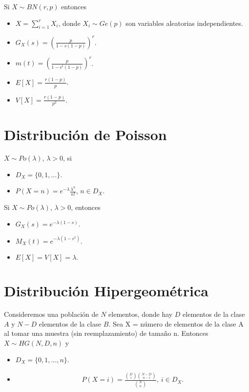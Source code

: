 \begin{obs}
    Si $X \sim BN(r,p)$ entonces
    \begin{itemize}
        \item $X = \sum_{i=1}^{r}{X_i}$, donde $X_i \sim Ge(p)$ son variables aleatorias independientes.
        \item $G_X(s) = \left(\frac{p}{1 - s(1 - p)}\right)^r$.
        \item $m(t) = \left(\frac{p}{1 - e^t(1 - p)}\right)^r$.
        \item $E[X] = \frac{r(1 - p)}{p}$.
        \item $V[X] = \frac{r(1 - p)}{p^2}$.
    \end{itemize}
\end{obs}

\section{Distribución de Poisson}

\begin{defi}
    $X \sim Po(\lambda)$, $\lambda > 0$, si
    \begin{itemize}
        \item $D_X = \{0,1,...\}$.
        \item $P(X = n) = e^{-\lambda}\frac{\lambda^n}{n!}$, $n \in D_X$.
    \end{itemize}
\end{defi}

\begin{obs}
    Si $X \sim Po(\lambda)$, $\lambda > 0$, entonces
    \begin{itemize}
        \item $G_X(s) = e^{-\lambda(1 - s)}$.
        \item $M_X(t) = e^{-\lambda(1 - e^t)}$.
        \item $E[X] = V[X] = \lambda$.
    \end{itemize}
\end{obs}

\section{Distribución Hipergeométrica}

\begin{defi}
    Consideremos una población de $N$ elementos, donde hay $D$ elementos de la clase $A$ y $N - D$ elementos de la clase $B$. Sea X = número de elementos de la clase A al tomar una muestra (sin reemplazamiento) de tamaño n. Entonces $X \sim HG(N,D,n)$ y
    \begin{itemize}
        \item $D_X = \{0,1,...,n\}$.
        \item
              \begin{align*}
                  P(X = i) = \frac{\binom{D}{i}\binom{N - D}{n - i}}{\binom{N}{n}}, \ i \in D_X.
              \end{align*}
    \end{itemize}
\end{defi}

